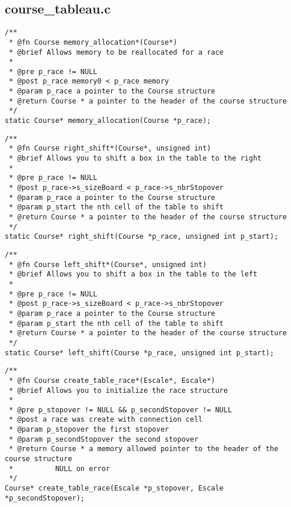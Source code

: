 \documentclass[a4paper, 11pt, oneside]{article}
\begin{document}
	\newpage
	
	\subsection{course\_tableau.c}
	
		\begin{lstlisting}
/**
 * @fn Course memory_allocation*(Course*)
 * @brief Allows memory to be reallocated for a race
 *
 * @pre p_race != NULL
 * @post p_race memory0 < p_race memory
 * @param p_race a pointer to the Course structure
 * @return Course * a pointer to the header of the course structure
 */
static Course* memory_allocation(Course *p_race);
		\end{lstlisting}
		
		\begin{lstlisting}
/**
 * @fn Course right_shift*(Course*, unsigned int)
 * @brief Allows you to shift a box in the table to the right
 *
 * @pre p_race != NULL
 * @post p_race->s_sizeBoard < p_race->s_nbrStopover
 * @param p_race a pointer to the Course structure
 * @param p_start the nth cell of the table to shift
 * @return Course * a pointer to the header of the course structure
 */
static Course* right_shift(Course *p_race, unsigned int p_start);
		\end{lstlisting}
		
		\begin{lstlisting}
/**
 * @fn Course left_shift*(Course*, unsigned int)
 * @brief Allows you to shift a box in the table to the left
 * 
 * @pre p_race != NULL
 * @post p_race->s_sizeBoard < p_race->s_nbrStopover
 * @param p_race a pointer to the Course structure
 * @param p_start the nth cell of the table to shift
 * @return Course * a pointer to the header of the course structure
 */
static Course* left_shift(Course *p_race, unsigned int p_start);
		\end{lstlisting}
		
		\begin{lstlisting}
/**
 * @fn Course create_table_race*(Escale*, Escale*)
 * @brief Allows you to initialize the race structure
 *
 * @pre p_stopover != NULL && p_secondStopover != NULL
 * @post a race was create with connection cell
 * @param p_stopover the first stopover
 * @param p_secondStopover the second stopover
 * @return Course * a memory allowed pointer to the header of the course structure
 * 			NULL on error
 */
Course* create_table_race(Escale *p_stopover, Escale *p_secondStopover);
		\end{lstlisting}
		
\end{document}
